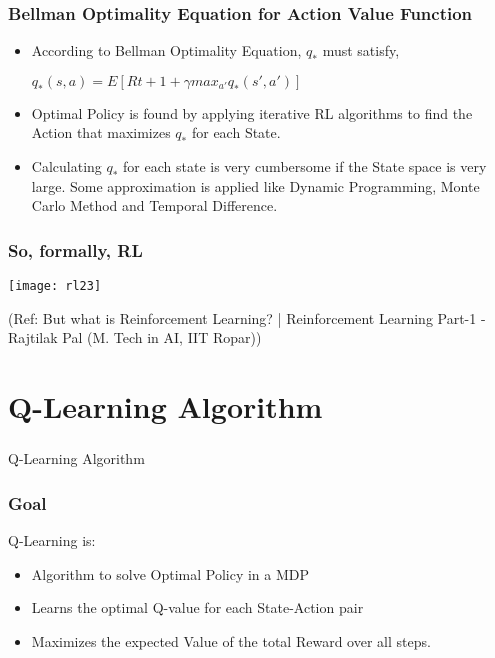 \begin{frame}[fragile]\frametitle{Bellman Optimality Equation for Action Value Function}

\begin{itemize}
\item According to Bellman Optimality Equation, $q_{*}$ must satisfy,

$q_{*}(s,a) = E[R{t+1} + \gamma max_{a'} q_{*}(s',a')]$

\item Optimal Policy is found by applying iterative RL algorithms to find the Action that maximizes $q_*$ for each State.

\item Calculating $q_*$ for each state is very cumbersome if the State space is very large. Some approximation is applied like Dynamic Programming, Monte Carlo Method and Temporal Difference.
\end{itemize}

\end{frame}

\begin{frame}[fragile]\frametitle{So, formally, RL}

\begin{center}
\texttt{[image: rl23]}
\end{center}

{\tiny (Ref: But what is Reinforcement Learning? | Reinforcement Learning Part-1 - Rajtilak Pal (M. Tech in AI, IIT Ropar))}
\end{frame}


\section[Q-Learn]{Q-Learning Algorithm}

\begin{frame}[fragile]\frametitle{}
\begin{center}
{\Large Q-Learning Algorithm}
\end{center}
\end{frame}

\begin{frame}[fragile]\frametitle{Goal}

Q-Learning is:

\begin{itemize}
\item Algorithm to solve Optimal Policy in a MDP
\item Learns the optimal Q-value for each State-Action pair
\item Maximizes the expected Value of the total Reward over all steps.
\end{itemize}

\end{frame}

